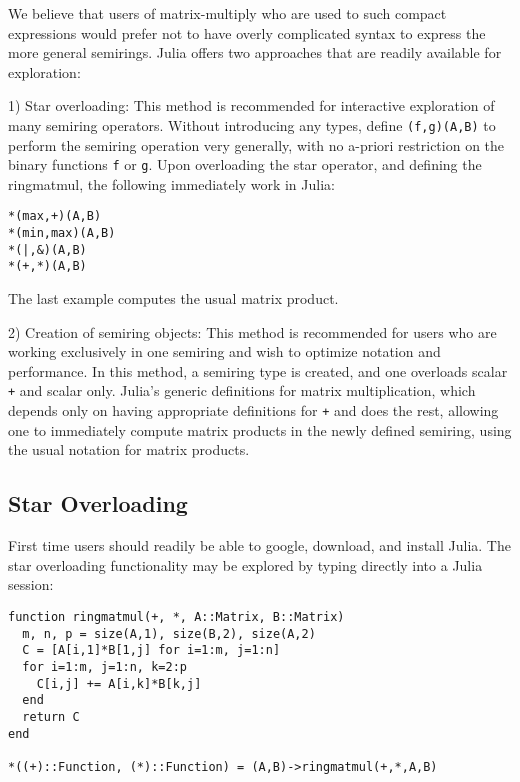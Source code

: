 \documentclass[conference]{IEEEtran}
\begin{document}
We believe that users of matrix-multiply who are used
to such compact expressions would prefer not to have
overly complicated syntax to express the more general
semirings.  Julia offers two approaches that are readily
available for exploration:

1) Star overloading:
This method is recommended for interactive exploration of many semiring operators.
Without introducing any types, define  {\tt *(f,g)(A,B)} to
perform the semiring operation very generally, with no a-priori restriction
on the binary functions {\tt f} or {\tt g}.   Upon overloading the star operator,
and defining the ringmatmul, the following immediately work in Julia:
\begin{verbatim}
*(max,+)(A,B)
*(min,max)(A,B)
*(|,&)(A,B)
*(+,*)(A,B)
\end{verbatim}
The last example computes the usual matrix product.

2) Creation of semiring objects:
This method is recommended for users who are working exclusively in one semiring and wish to optimize notation and performance.
In this method, a semiring type is created, and one overloads scalar {\tt +} and scalar {\tt *} only.
Julia's generic definitions for matrix multiplication, which depends only on having appropriate definitions for {\tt +} and {\tt *} does the rest, allowing one to immediately compute matrix products in the newly defined semiring, using the usual notation for matrix products.

\subsection{Star Overloading}

First time users should readily be able to google, download, and install Julia.
The star overloading functionality may be explored by typing directly into a Julia session:
\begin{verbatim}
function ringmatmul(+, *, A::Matrix, B::Matrix)
  m, n, p = size(A,1), size(B,2), size(A,2)
  C = [A[i,1]*B[1,j] for i=1:m, j=1:n]
  for i=1:m, j=1:n, k=2:p
    C[i,j] += A[i,k]*B[k,j]
  end
  return C
end

*((+)::Function, (*)::Function) = (A,B)->ringmatmul(+,*,A,B)
\end{verbatim}
\end{document}
